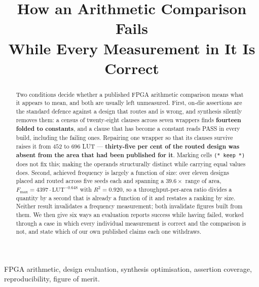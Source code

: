 \documentclass[conference,10pt]{IEEEtran}
\theoremstyle{definition}
\begin{document}
\title{How an Arithmetic Comparison Fails\\
       While Every Measurement in It Is Correct}

\author{}

\maketitle

\begin{abstract}
Two conditions decide whether a published FPGA arithmetic comparison means what
it appears to mean, and both are usually left unmeasured. First, on-die
assertions are the standard defence against a design that routes and is wrong,
and synthesis silently removes them: a census of twenty-eight clauses across
seven wrappers finds \textbf{fourteen folded to constants}, and a clause that
has become a constant reads PASS in every build, including the failing ones.
Repairing one wrapper so that its clauses survive raises it from $452$ to $696$
LUT --- \textbf{thirty-five per cent of the routed design was absent from the
area that had been published for it}. Marking cells \texttt{(* keep *)} does not
fix this; making the operands structurally distinct while carrying equal values
does. Second, achieved frequency is largely a function of size: over eleven
designs placed and routed across five seeds each and spanning a $39.6\times$
range of area, $F_{\max}=4397\cdot\mathrm{LUT}^{-0.648}$ with $R^{2}=0.920$, so
a throughput-per-area ratio divides a quantity by a second that is already a
function of it and restates a ranking by size. Neither result invalidates a
frequency measurement; both invalidate figures built from them. We then give six
ways an evaluation reports success while having failed, worked through a case in
which every individual measurement is correct and the comparison is not, and
state which of our own published claims each one withdraws.
\end{abstract}

\begin{IEEEkeywords}
FPGA arithmetic, design evaluation, synthesis optimisation, assertion coverage,
reproducibility, figure of merit.
\end{IEEEkeywords}





\balance

\end{document}
